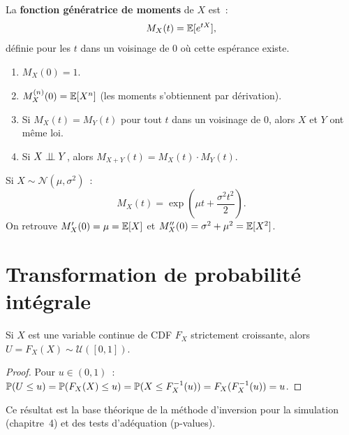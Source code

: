 \begin{definition}
La \textbf{fonction g\'en\'eratrice de moments} de $X$ est~:
\[
    M_X(t) = \mathbb{E}[e^{tX}],
\]
d\'efinie pour les $t$ dans un voisinage de 0 o\`u cette esp\'erance existe.
\end{definition}

\begin{proposition}
\begin{enumerate}[label=(\roman*)]
    \item $M_X(0) = 1$.
    \item $M_X^{(n)}(0) = \mathbb{E}[X^n]$ (les moments s'obtiennent par d\'erivation).
    \item Si $M_X(t) = M_Y(t)$ pour tout $t$ dans un voisinage de 0, alors
          $X$ et $Y$ ont m\^eme loi.
    \item Si $X \perp\!\!\!\perp Y$, alors $M_{X+Y}(t) = M_X(t) \cdot M_Y(t)$.
\end{enumerate}
\end{proposition}

\begin{exemple}
Si $X \sim \mathcal{N}(\mu, \sigma^2)$~:
\[
    M_X(t) = \exp\!\left(\mu t + \frac{\sigma^2 t^2}{2}\right).
\]
On retrouve $M_X'(0) = \mu = \mathbb{E}[X]$ et
$M_X''(0) = \sigma^2 + \mu^2 = \mathbb{E}[X^2]$.
\end{exemple}

\section{Transformation de probabilit\'e int\'egrale}

\begin{theoreme}
Si $X$ est une variable continue de CDF $F_X$ strictement croissante, alors
$U = F_X(X) \sim \mathcal{U}([0,1])$.
\end{theoreme}

\begin{proof}
Pour $u \in (0,1)$~:
$\mathbb{P}(U \leq u) = \mathbb{P}(F_X(X) \leq u) = \mathbb{P}(X \leq F_X^{-1}(u)) = F_X(F_X^{-1}(u)) = u$.
\end{proof}

\begin{remarque}
Ce r\'esultat est la base th\'eorique de la m\'ethode d'inversion pour la simulation
(chapitre~4) et des tests d'ad\'equation (p-values).
\end{remarque}

